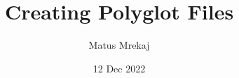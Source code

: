 \documentclass[fontsize=11pt,twocolumn]{article}
\title{\textbf{Creating Polyglot Files}}
\author{Matus Mrekaj}
\date{12 Dec 2022}
\begin{document}
\maketitle

\textbf{}






\begin{spacing}{1}
    \printbibliography
\end{spacing}
\end{document}
